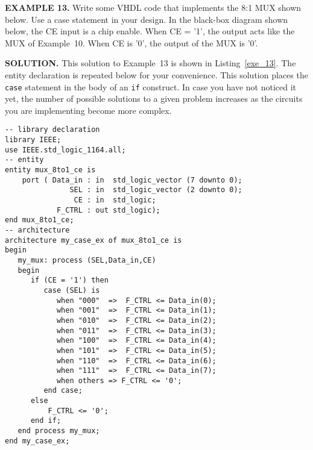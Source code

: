 \begin{leftbar}
\begin{minipage}{0.5\linewidth}
\noindent
\textbf{EXAMPLE 13.}
Write some VHDL code that implements the 8:1 MUX shown below. Use a case statement in your design. In the black-box diagram shown below, the CE input is a chip enable. When CE = '1', the output acts like the MUX of Example~10. When CE is '0', the output of the MUX is '0'.
\end{minipage}
\begin{minipage}{0.47\linewidth}
\begin{flushright}
\end{flushright}
\end{minipage}
\end{leftbar}
\noindent
\textbf{SOLUTION.} This solution to Example~13 is shown in Listing~\ref{exe_13}. The entity declaration is repeated below for your convenience. This solution places the \texttt{case} statement in the body of an \texttt{if} construct. In case you have not noticed it yet, the number of possible solutions to a given problem increases as the circuits you are implementing become more complex.

\noindent
\begin{minipage}{0.99\linewidth}
\begin{lstlisting}[label=exe_13, caption=Solution to Example~13.]
-- library declaration
library IEEE;
use IEEE.std_logic_1164.all;
-- entity
entity mux_8to1_ce is
    port ( Data_in : in  std_logic_vector (7 downto 0);
               SEL : in  std_logic_vector (2 downto 0);
                CE : in  std_logic;
            F_CTRL : out std_logic);  
end mux_8to1_ce;
-- architecture
architecture my_case_ex of mux_8to1_ce is 
begin
   my_mux: process (SEL,Data_in,CE)
   begin
      if (CE = '1') then 
         case (SEL) is 
            when "000"  =>  F_CTRL <= Data_in(0); 
            when "001"  =>  F_CTRL <= Data_in(1); 
            when "010"  =>  F_CTRL <= Data_in(2); 
            when "011"  =>  F_CTRL <= Data_in(3); 
            when "100"  =>  F_CTRL <= Data_in(4); 
            when "101"  =>  F_CTRL <= Data_in(5); 
            when "110"  =>  F_CTRL <= Data_in(6); 
            when "111"  =>  F_CTRL <= Data_in(7); 
            when others => F_CTRL <= '0'; 
         end case; 
      else
          F_CTRL <= '0'; 
      end if; 
   end process my_mux; 
end my_case_ex;
\end{lstlisting}
\end{minipage}


